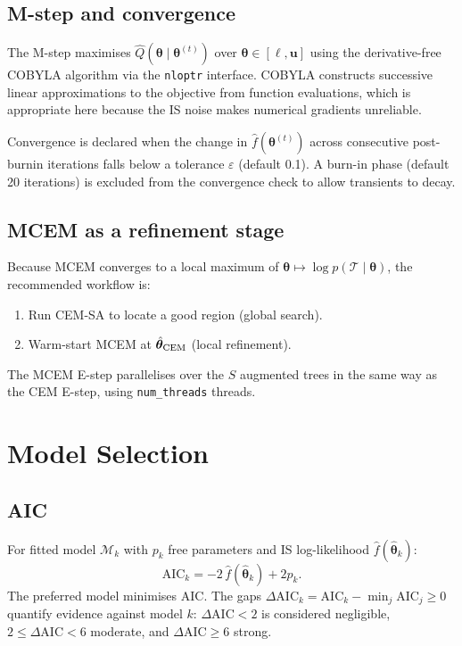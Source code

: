 \documentclass[12pt,a4paper]{article}
\newcommand{\obs}{\mathcal{T}}
\newcommand{\pars}{\bm{\theta}}
\newcommand{\lb}{\bm{\ell}}
\newcommand{\ub}{\mathbf{u}}
\newcommand{\fhat}{\widehat{f}}
\newcommand{\AIC}{\mathrm{AIC}}
\begin{document}
\subsection{M-step and convergence}

The M-step maximises $\hat{Q}(\pars\mid\pars^{(t)})$ over $\pars\in[\lb,\ub]$
using the derivative-free COBYLA algorithm \citep{powell1994direct} via the
\texttt{nloptr} interface. COBYLA constructs successive linear approximations
to the objective from function evaluations, which is appropriate here because
the IS noise makes numerical gradients unreliable.

Convergence is declared when the change in $\fhat(\pars^{(t)})$ across
consecutive post-burnin iterations falls below a tolerance $\varepsilon$
(default 0.1). A burn-in phase (default 20 iterations) is excluded from
the convergence check to allow transients to decay.

\subsection{MCEM as a refinement stage}

Because MCEM converges to a local maximum of $\pars \mapsto
\log p(\obs\mid\pars)$, the recommended workflow is:
\begin{enumerate}
  \item Run CEM-SA to locate a good region (global search).
  \item Warm-start MCEM at $\hat{\pars}_{\rm CEM}$ (local refinement).
\end{enumerate}
The MCEM E-step parallelises over the $S$ augmented trees in the same way
as the CEM E-step, using \texttt{num\_threads} threads.

\section{Model Selection}\label{sec:modelsel}

\subsection{AIC}

For fitted model $\mathcal{M}_k$ with $p_k$ free parameters and IS
log-likelihood $\fhat(\hat{\pars}_k)$:
\begin{equation}\label{eq:AIC}
  \AIC_k = -2\,\fhat(\hat{\pars}_k) + 2 p_k.
\end{equation}
The preferred model minimises $\AIC$. The gaps
$\Delta\AIC_k = \AIC_k - \min_j \AIC_j \geq 0$ quantify evidence against
model $k$: $\Delta\AIC < 2$ is considered negligible,
$2 \leq \Delta\AIC < 6$ moderate, and $\Delta\AIC \geq 6$ strong.
\end{document}
